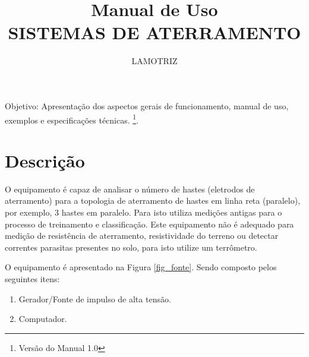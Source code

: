\documentclass[a4paper, 10pt]{article}
\title{Manual de Uso\\SISTEMAS DE ATERRAMENTO}
\author{LAMOTRIZ}
\begin{document}
\maketitle

Objetivo: Apresentação dos aspectos gerais de funcionamento, manual de uso, 
exemplos e  especificações técnicas.
\footnote{Versão do Manual 1.0}.


\newpage

\tableofcontents

\newpage

\listoffigures

\newpage

\section{Descrição}

O equipamento é capaz de analisar o número de hastes
(eletrodos de aterramento) para a topologia de aterramento
de hastes em linha reta (paralelo), por exemplo, 3 hastes em paralelo. 
Para isto utiliza medições antigas para o processo de treinamento e 
classificação. Este equipamento não é adequado para medição de 
resistência de aterramento, resistividade do terreno ou detectar correntes 
parasitas presentes no solo, para isto utilize um terrômetro. 

O equipamento é apresentado na Figura \ref{fig_fonte}. Sendo composto pelos 
seguintes itens:


\begin{enumerate}
    \item Gerador/Fonte de impulso de alta tensão.
    \item Computador.
\end{enumerate}
\end{document}
